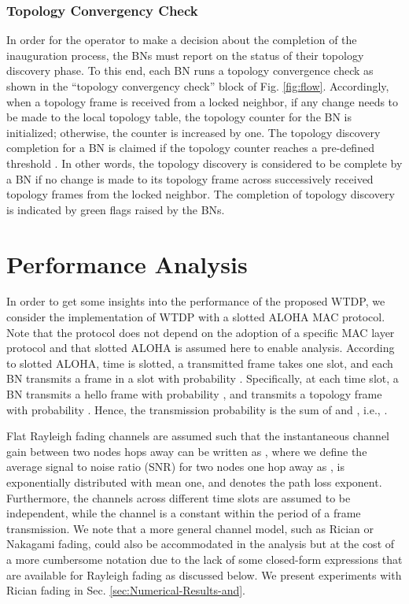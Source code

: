 \documentclass[10pt,english,two column]{IEEEtran}
\begin{document}
\subsubsection{Topology Convergency Check\label{sub:Topology-Convergency-Check}}

In order for the operator to make a decision about the completion
of the inauguration process, the BNs must report on the status of
their topology discovery phase. To this end, each BN runs a topology
convergence check as shown in the ``topology convergency check''
block of Fig. \ref{fig:flow}. Accordingly, when a topology frame
is received from a locked neighbor, if any change needs to be made
to the local topology table, the topology counter for the BN is initialized;
otherwise, the counter is increased by one. The topology discovery
completion for a BN is claimed if the topology counter reaches a pre-defined
threshold . In other words, the topology discovery is considered
to be complete by a BN if no change is made to its topology frame
across  successively received topology frames from the locked
neighbor. The completion of topology discovery is indicated by green
flags raised by the BNs. 


\section{Performance Analysis\label{sec:Performance-Analysis-with}}

In order to get some insights into the performance of the proposed
WTDP, we consider the implementation of WTDP with a slotted ALOHA
MAC protocol. Note that the protocol does not depend on the adoption
of a specific MAC layer protocol and that slotted ALOHA is assumed
here to enable analysis. According to slotted ALOHA, time is slotted,
a transmitted frame takes one slot, and each BN transmits a frame
in a slot with probability . Specifically, at each time slot,
a BN transmits a hello frame with probability , and transmits
a topology frame with probability . Hence, the transmission
probability  is the sum of  and , i.e., . 

Flat Rayleigh fading channels are assumed such that the instantaneous
channel gain between two nodes  hops away can be written as ,
where we define the average signal to noise ratio (SNR) for two nodes
one hop away as ,  is exponentially
distributed with mean one, and  denotes the path loss exponent.
Furthermore, the channels across different time slots are assumed
to be independent, while the channel is a constant within the period
of a frame transmission. We note that a more general channel model,
such as Rician or Nakagami fading, could also be accommodated in the
analysis but at the cost of a more cumbersome notation due to the
lack of some closed-form expressions that are available for Rayleigh
fading as discussed below. We present experiments with Rician fading
in Sec. \ref{sec:Numerical-Results-and}. 
\end{document}
